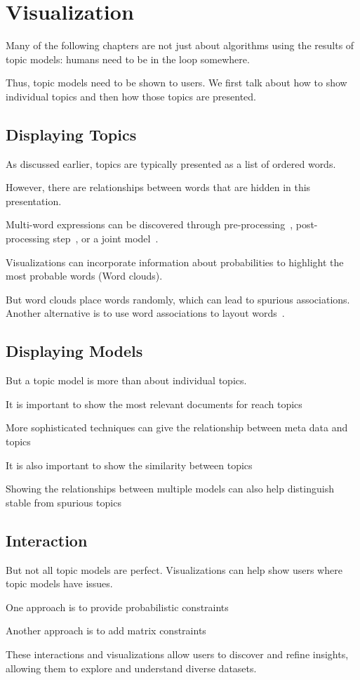 

\chapter{Visualization}
\label{ch:viz}

Many of the following chapters are not just about algorithms using the
results of topic models: humans need to be in the loop somewhere.

Thus, topic models need to be shown to users.  We first talk about how
to show individual topics and then how those topics are presented.

\section{Displaying Topics}

As discussed earlier, topics are typically presented as a list of
ordered words.

However, there are relationships between words that are hidden in this
presentation.

Multi-word expressions can be discovered through
pre-processing~\citep{talley-11}, post-processing step~\citep{blei-09b},
or a joint model~\citep{johnson-10}.

Visualizations can incorporate information about probabilities to
highlight the most probable words (Word clouds).

But word clouds place words randomly, which can lead to spurious
associations.  Another alternative is to use word associations to
layout words~\citep{Smith:Chuang:Hu:Boyd-Graber:Findlater-2014}.

\section{Displaying Models}

But a topic model is more than about individual topics.

It is important to show the most relevant documents for reach
topics~\citep{chaney-12}

More sophisticated techniques can give the relationship between meta
data and topics~\citep{gardner-10,eistenstein-14}

It is also important to show the similarity between
topics~\citep{chuang-12}

Showing the relationships between multiple models can also help
distinguish stable from spurious topics~\citep{chuang-15} 

\section{Interaction}

But not all topic models are perfect.  Visualizations can help show
users where topic models have issues. 

One approach is to provide probabilistic constraints~\citep{hu-14:itm}

Another approach is to add matrix constraints~\citep{choo-13}

These interactions and visualizations allow users to discover and
refine insights, allowing them to explore and understand diverse
datasets.